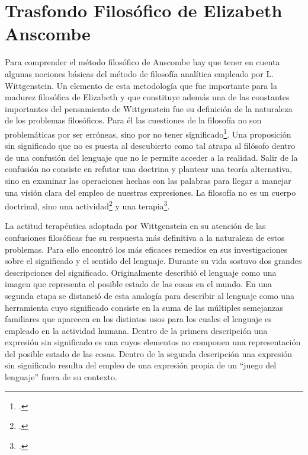 \section{Trasfondo Filosófico de Elizabeth Anscombe}


Para comprender el método filosófico de Anscombe hay que tener en cuenta algunas nociones básicas del método de filosofía analítica empleado por L. Wittgenstein. Un elemento de esta metodología que fue importante para la madurez filosófica de Elizabeth y que constituye además una de las constantes importantes del pensamiento de Wittgenstein fue su definición de la naturaleza de los problemas filosóficos. Para él las cuestiones de la filosofía no son problemáticas por ser erróneas, sino por no tener significado\footcite[Cf.][\S4.003]{wittgenstein1922tractatuses}. Una proposición sin significado que no es puesta al descubierto como tal atrapa al filósofo dentro de una confusión del lenguaje que no le permite acceder a la realidad. Salir de la confusión no consiste en refutar una doctrina y plantear una teoría alternativa, sino en examinar las operaciones hechas con las palabras para llegar a manejar una visión clara del empleo de nuestras expresiones. La filosofía no es un cuerpo doctrinal, sino una actividad\footcite[Cf.][\S4.112]{wittgenstein1922tractatuses} y una terapia\footcite[Cf.][\S133]{wittgenstein1953phiinv}.

La actitud terapéutica adoptada por Wittgenstein en su atención de las confusiones filosóficas fue su respuesta más definitiva a la naturaleza de estos problemas. Para ello encontró los más eficaces remedios en sus investigaciones sobre el significado y el sentido del lenguaje.
Durante su vida sostuvo dos grandes descripciones del significado. Originalmente describió el lenguaje como una imagen que representa el posible estado de las cosas en el mundo. En una segunda etapa se distanció de esta analogía para describir al lenguaje como una herramienta cuyo significado consiste en la suma de las múltiples semejanzas familiares que aparecen en los distintos usos para los cuales el lenguaje es empleado en la actividad humana. Dentro de la primera descripción una expresión sin significado es una cuyos elementos no componen una representación del posible estado de las cosas. Dentro de la segunda descripción una expresión sin significado resulta del empleo de una expresión propia de un ``juego del lenguaje'' fuera de su contexto.

